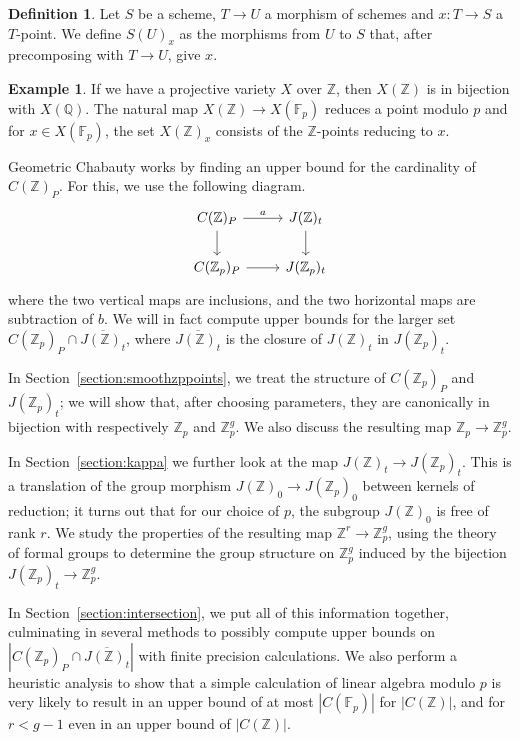 \documentclass[12pt]{article}
\newcommand{\Z}{\mathbb{Z}}
\newcommand{\Q}{\mathbb{Q}}
\newcommand{\F}{\mathbb{F}}
\theoremstyle{plain}
\theoremstyle{definition}
\newtheorem{defn}[thm]{Definition} %
\newtheorem{exmp}[thm]{Example} %
\theoremstyle{remark}
\begin{document}
\begin{defn}
Let $S$ be a scheme, $T \to U$ a morphism of schemes and $x : T \to S$ a $T$-point. We define $S(U)_x$ as the morphisms from $U$ to $S$ that, after precomposing with $T \to U$, give $x$.
\end{defn}
\begin{exmp}
If we have a projective variety $X$ over $\Z$, then $X(\Z)$ is in bijection with $X(\Q)$. The natural map $X(\Z) \to X(\F_p)$ reduces a point modulo $p$ and for $x \in X(\F_p)$, the set $X(\Z)_x$ consists of the $\Z$-points reducing to $x$.
\end{exmp}

Geometric Chabauty works by finding an upper bound for the cardinality of $C(\Z)_P$. For this, we use the following diagram.
\[
\begin{tikzcd}
C(\Z)_P \arrow[d] \arrow[r, "a"] & J(\Z)_t \arrow[d] \\
C(\Z_p)_P \arrow[r]              & J(\Z_p)_t        
\end{tikzcd}
\]
where the two vertical maps are inclusions, and the two horizontal maps are subtraction of $b$. We will in fact compute upper bounds for the larger set $C(\Z_p)_P \cap \overline{J(\Z)_t}$, where $\overline{J(\Z)_t}$ is the closure of $J(\Z)_t$ in $J(\Z_p)_t$. 

In Section~\ref{section:smoothzppoints}, we treat the structure of $C(\Z_p)_P$ and $J(\Z_p)_t$; we will show that, after choosing parameters, they are canonically in bijection with respectively $\Z_p$ and $\Z_p^g$. We also discuss the resulting map $\Z_p \to \Z_p^g$.

In Section~\ref{section:kappa} we further look at the map $J(\Z)_t \to J(\Z_p)_t$. This is a translation of the group morphism $J(\Z)_0 \to J(\Z_p)_0$ between kernels of reduction; it turns out that for our choice of $p$, the subgroup $J(\Z)_0$ is free of rank $r$. We study the properties of the resulting map $\Z^r \to \Z_p^g$, using the theory of formal groups to determine the group structure on $\Z_p^g$ induced by the bijection $J(\Z_p)_t \to \Z_p^g$.

In Section~\ref{section:intersection}, we put all of this information together, culminating in several methods to possibly compute upper bounds on $\left|C(\Z_p)_P \cap \overline{J(\Z)_t}\right|$ with finite precision calculations. We also perform a heuristic analysis to show that a simple calculation of linear algebra modulo $p$ is very likely to result in an upper bound of at most $|C(\F_p)|$ for $|C(\Z)|$, and for $r < g-1$ even in an upper bound of $|C(\Z)|$.
\end{document}
